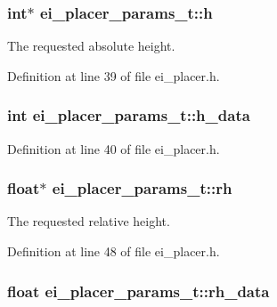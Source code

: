 \hypertarget{structei__placer__params__t_ab1f1683f0e5ff5b10881851f7de923b5}{
\subsubsection[{h}]{\setlength{\rightskip}{0pt plus 5cm}int$\ast$ ei\-\_\-placer\-\_\-params\-\_\-t\-::h}}\label{structei__placer__params__t_ab1f1683f0e5ff5b10881851f7de923b5}


The requested absolute height. 



Definition at line 39 of file ei\-\_\-placer.\-h.

\hypertarget{structei__placer__params__t_af2ea394033d83268def0c71659aece7a}{
\subsubsection[{h\-\_\-data}]{\setlength{\rightskip}{0pt plus 5cm}int ei\-\_\-placer\-\_\-params\-\_\-t\-::h\-\_\-data}}\label{structei__placer__params__t_af2ea394033d83268def0c71659aece7a}


Definition at line 40 of file ei\-\_\-placer.\-h.

\hypertarget{structei__placer__params__t_a54a438796f9ce98d6abe1b0406db2981}{
\subsubsection[{rh}]{\setlength{\rightskip}{0pt plus 5cm}float$\ast$ ei\-\_\-placer\-\_\-params\-\_\-t\-::rh}}\label{structei__placer__params__t_a54a438796f9ce98d6abe1b0406db2981}


The requested relative height. 



Definition at line 48 of file ei\-\_\-placer.\-h.

\hypertarget{structei__placer__params__t_aa4b888e5ade5aff39206f658b8171351}{
\subsubsection[{rh\-\_\-data}]{\setlength{\rightskip}{0pt plus 5cm}float ei\-\_\-placer\-\_\-params\-\_\-t\-::rh\-\_\-data}}\label{structei__placer__params__t_aa4b888e5ade5aff39206f658b8171351}


